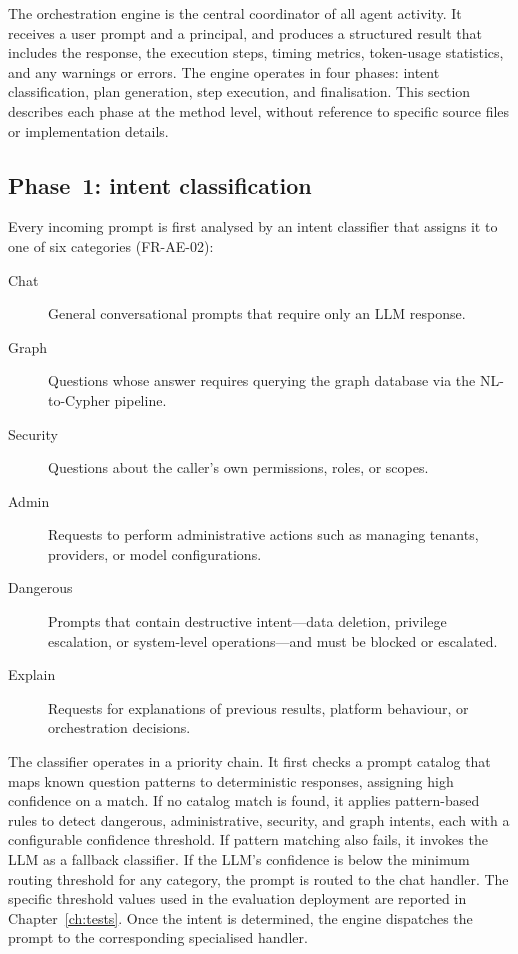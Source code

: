 \documentclass[a4paper]{sapthesis}
\begin{document}
The orchestration engine is the central coordinator of all agent activity.
It receives a user prompt and a principal, and produces a structured
result that includes the response, the execution steps, timing metrics,
token-usage statistics, and any warnings or errors.  The engine operates
in four phases: intent classification,
plan generation, step execution, and finalisation.  This section
describes each phase at the method level, without reference to specific
source files or implementation details.

\subsection{Phase~1: intent classification}

Every incoming prompt is first analysed by an intent classifier that
assigns it to one of six categories (FR-AE-02):

\begin{description}
    \item[Chat] General conversational prompts that require only an LLM
        response.
    \item[Graph] Questions whose answer requires querying the graph
        database via the NL-to-Cypher pipeline.
    \item[Security] Questions about the caller's own permissions, roles,
        or scopes.
    \item[Admin] Requests to perform administrative actions such as
        managing tenants, providers, or model configurations.
    \item[Dangerous] Prompts that contain destructive intent---data
        deletion, privilege escalation, or system-level operations---and
        must be blocked or escalated.
    \item[Explain] Requests for explanations of previous results, platform
        behaviour, or orchestration decisions.
\end{description}

The classifier operates in a priority chain.  It first checks a prompt
catalog that maps known question patterns to deterministic responses,
assigning high confidence on a match.  If no catalog match is found, it
applies pattern-based rules to detect dangerous, administrative, security,
and graph intents, each with a configurable confidence threshold.  If
pattern matching also fails, it invokes the LLM as a fallback classifier.
If the LLM's confidence is below the minimum routing threshold for any
category, the prompt is routed to the chat handler.  The specific
threshold values used in the evaluation deployment are reported in
Chapter~\ref{ch:tests}.  Once the intent is determined, the engine
dispatches the prompt to the corresponding specialised handler.
\end{document}
